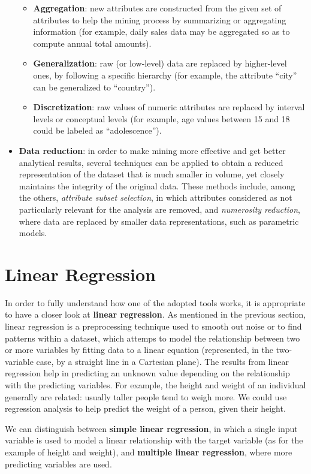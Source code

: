 \begin{itemize}
\begin{itemize}
\item \textbf{Aggregation}: new attributes are constructed from the given set of attributes to help the mining process by summarizing or aggregating information (for example, daily sales data may be aggregated so as to compute annual total amounts).
\item \textbf{Generalization}: raw (or low-level) data are replaced by higher-level ones, by following a specific hierarchy (for example, the attribute ``city'' can be generalized to ``country'').
\item \textbf{Discretization}: raw values of numeric attributes are replaced by interval levels or conceptual levels (for example, age values between 15 and 18 could be labeled as ``adolescence'').
\end{itemize}
\item \textbf{Data reduction}: in order to make mining more effective and get better analytical results, several techniques can be applied to obtain a reduced representation of the dataset that is much smaller in volume, yet closely maintains the integrity of the original data. These methods include, among the others, \textit{attribute subset selection}, in which attributes considered as not particularly relevant for the analysis are removed, and \textit{numerosity reduction}, where data are replaced by smaller data representations, such as parametric models.
\end{itemize}


\section{Linear Regression}
\label{section:linear_regression}
In order to fully understand how one of the adopted tools works, it is appropriate to have a closer look at \textbf{linear regression}. As mentioned in the previous section, linear regression is a preprocessing technique used to smooth out noise or to find patterns within a dataset, which attemps to model the relationship between two or more variables by fitting data to a linear equation (represented, in the two-variable case, by a straight line in a Cartesian plane). The results from linear regression help in predicting an unknown value depending on the relationship with the predicting variables. For example, the height and weight of an individual generally are related: usually taller people tend to weigh more. We could use regression analysis to help predict the weight of a person, given their height.

We can distinguish between \textbf{simple linear regression}, in which a single input variable is used to model a linear relationship with the target variable (as for the example of height and weight), and \textbf{multiple linear regression}, where more predicting variables are used.

